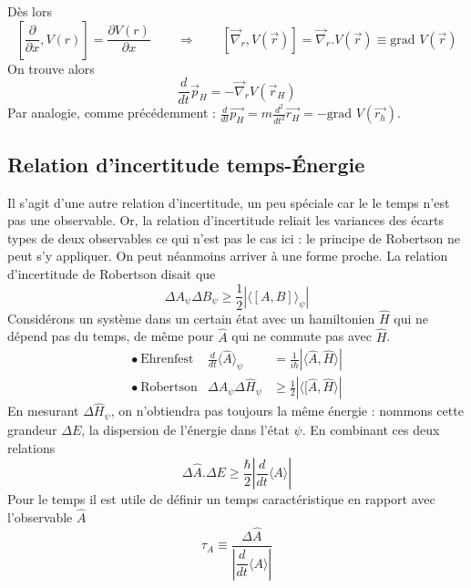 Dès lors
\begin{equation}
\left[\frac{\partial}{\partial x}, V(r)\right] = \dfrac{\partial V(r)}{\partial x} \qquad \Longrightarrow\qquad
[\vec{\nabla}_r,V(\vec{r})] = \vec{\nabla}_r.V(\vec{r}) \equiv \text{grad } V(\vec{r})
\end{equation}
On trouve alors 
\begin{equation}
\dfrac{d}{dt}\vec{p}_H = -\vec{\nabla}_rV(\vec{r}_H)
\end{equation}
Par analogie, comme précédemment : $\frac{d}{dt}\vec{p_H} =m\frac{d^2}{dt^2}\vec{r_H}= -\text{grad }V(\vec{r_h})$.


\subsection{Relation d'incertitude temps-Énergie}
Il s'agit d'une autre relation d'incertitude, un peu spéciale car le le temps n'est pas une observable. Or, 
la relation d'incertitude reliait les variances des écarts types de deux observables ce qui n'est pas le cas ici : le principe de Robertson ne peut s'y appliquer. On peut néanmoins arriver à une forme proche. La relation d'incertitude de Robertson disait que
\begin{equation}
\Delta A_\psi \Delta B_\psi \geq \frac{1}{2}\left|\langle [A,B]\rangle_\psi\right|
\end{equation}
Considérons un système dans un certain état avec un hamiltonien $\hat H$ qui ne dépend pas du 
temps, de même pour $\hat A$ qui ne commute pas avec $\hat{H}$. 
\begin{equation}
\begin{array}{lll}
\bullet\ \text{Ehrenfest} & \frac{d}{dt}\langle \hat{A}\rangle_\psi &= \frac{1}{i\hbar}|\langle\hat{A},\hat{H}
\rangle|\\
\bullet\ \text{Robertson} & \Delta A_\psi\Delta\hat{H}_\psi &\geq \frac{1}{2}|\langle [\hat{A},\hat{H} \rangle|
\end{array}
\end{equation}
En mesurant $\Delta\hat{H}_\psi$, on n'obtiendra pas toujours la même énergie : nommons cette grandeur $\Delta E$, 
la dispersion de l'énergie dans l'état $\psi$. En combinant ces deux relations
\begin{equation}
\Delta\hat{A}.\Delta E \geq \dfrac{\hbar}{2}\left|\dfrac{d}{dt}\langle A\rangle \right|
\end{equation}
Pour le temps il est utile de définir un temps caractéristique en rapport avec l'observable 
$\hat{A}$
\begin{equation}
\tau_A \equiv \dfrac{\Delta\hat{A}}{\left|\dfrac{d}{dt}\langle A\rangle \right|}
\end{equation}
